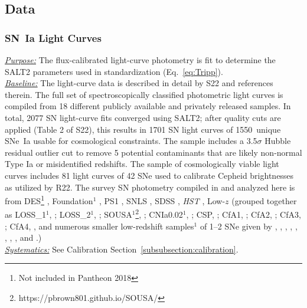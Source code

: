 \documentclass[twocolumn]{aastex63}
\def\nunique{1550}
\begin{document}
\subsection{Data}

\subsubsection{\textbf{SN~Ia Light Curves}}
\label{subsubsection:lightcurves}

\noindent\uline{\textit{Purpose:}} The flux-calibrated light-curve photometry is fit to determine the SALT2 parameters used in standardization (Eq.~\ref{eq:Tripp}). \\
\uline{\textit{Baseline:}} The light-curve data is described in detail by S22 and references therein. The full set of spectroscopically classified photometric light curves is compiled from 18 different publicly available and privately released samples. In total, 2077 SN light-curve fits converged using SALT2; after quality cuts are applied (Table 2 of S22), this results in 1701 SN light curves {of \nunique\ unique SNe~Ia} usable for cosmological constraints. The {sample} includes a 3.5$\sigma$ {Hubble residual} outlier cut to remove { 5} potential contaminants { that are likely} non-normal Type Ia or misidentified redshifts. {The sample of cosmologically viable light curves includes} 81 light curves of 42 SNe used to calibrate Cepheid brightnesses as utilized by R22. The survey SN photometry compiled in \cite{plussample} and analyzed here is from DES\footnote[1]{Not included in Pantheon 2018} \citep{Brout18a,Smith_2020}, Foundation$^1$ \citep{Foley2018}, PS1 \citep{Scolnic18}, SNLS \citep{Betoule14}, SDSS \citep{Sako11}, {\it HST} \citep{Gilliland1998,Riess2001,Suzuki2012,Riess2018,Riess2004,Riess2007}, Low-$z$ (grouped together as 
LOSS\_1$^1$, \citealp{Ganeshalingam2010}; LOSS\_2$^1$, 
\citealp{Stahl2019}; SOUSA$^1$\footnote{
https://pbrown801.github.io/SOUSA/}, \citealp{sousa14}; CNIa0.02$^1$, \citealp{CNIa0.02}; CSP, \citealp
{krisciunis17}; CfA1, \citealp{Riess99}; CfA2, \citealp{jha06}; CfA3, \citealp{hicken09a}; CfA4, \citealp{Hicken12}, and numerous smaller low-redshift samples$^1$ of 1--2 SNe given by \citealt{Burns18}, \citealt{Burns20}, \citealt{Milne10}, \citealt{Kris2017_df}, \citealt{Stritzinger10}, \citealt{Gall2018}, \citealt{Zhang10}, \citealt{Tsvetkov10}, and \citealt{Kawabata20}.) \\
\uline{\textit{Systematics:}} See Calibration Section~\ref{subsubsection:calibration}.
\end{document}
